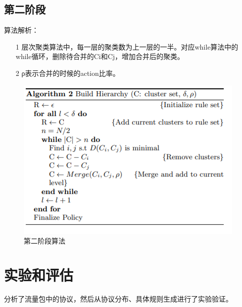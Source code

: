 \documentclass[UTF8]{ctexart}
\begin{document}
	\subsection{第二阶段}
	算法解析：
	\begin{itemize}
		\item[1] 层次聚类算法中，每一层的聚类数为上一层的一半。对应while算法中的while循环，删除待合并的Ci和Cj，增加合并后的聚类。
		\item[2] ρ表示合并的时候的action比率。
	\end{itemize}
	\begin{figure}[ht]
        \centering
        \includegraphics[scale=2.0]{picture/005.png}
        \caption{第二阶段算法}
        \label{fig:005}
    \end{figure}
	\clearpage
	\section{实验和评估}\label{sec:diwujie}
	分析了流量包中的协议，然后从协议分布、具体规则生成进行了实验验证。
	\clearpage
    
\end{document}
